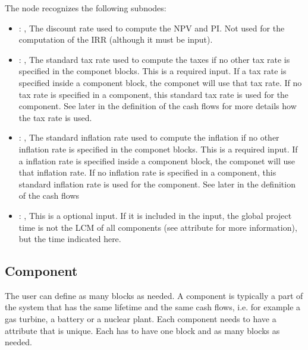 \begin{itemize}
      The  node recognizes the following subnodes:
      \begin{itemize}
        \item {}: , 
          The discount rate used to compute the NPV and PI. Not used for the computation of the IRR
          (although it must be input).

        \item {}: , 
          The standard tax rate used to compute the taxes if no other tax rate is specified in the
          componet blocks. This is a required input. If a tax rate is specified inside a component
          block, the componet will use that tax rate. If no tax rate is specified in a component,
          this standard tax rate is used for the component. See later in the definition of the cash
          flows for more details how the tax rate is used.

        \item {}: , 
          The standard inflation rate used to compute the inflation if no other inflation rate is
          specified in the componet blocks. This is a required input. If a inflation rate is
          specified inside a component block, the componet will use that inflation rate. If no
          inflation rate is specified in a component, this standard inflation rate is used for the
          component. See later in the definition of the cash flows

        \item {}: , 
          This is a optional input. If it is included in the input, the global project time is not
          the LCM of all components (see  attribute  for more
          information), but the time indicated here.
      \end{itemize}
  \end{itemize}




\subsection{Component}
  The user can define as many  blocks as needed. A component is typically a part
  of the system that has the same lifetime and
  the same cash flows, i.e. for example a gas turbine, a battery or a nuclear plant. Each component
  needs to have a  attribute that is unique.
  Each  has to have one  block and as many 
  blocks as needed.

